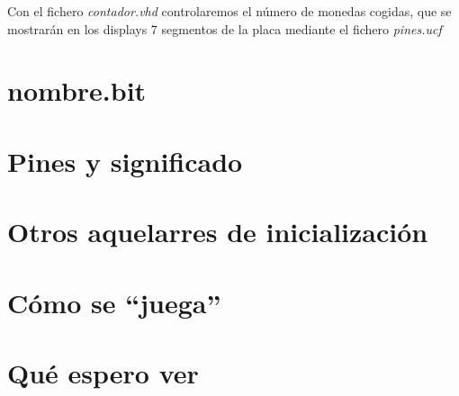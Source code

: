\documentclass[11pt, a4paper, spanish, openright, twoside]{book}
\begin{document}
Con el fichero \textit{contador.vhd} controlaremos el número de monedas cogidas, que se mostrarán en los displays 7 segmentos de la placa mediante el fichero \textit{pines.ucf}

\section{nombre.bit}


\section{Pines y significado}


\section{Otros aquelarres de inicialización}


\section{Cómo se ``juega''}


\section{Qué espero ver}
\end{document}

